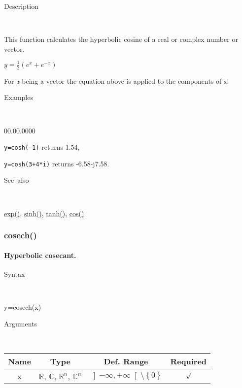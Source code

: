 \begin{description}
\item [Description]~
\end{description}
This function calculates the hyperbolic cosine of a real or complex
number or vector.

\medskip{}
$y=\frac{1}{2}\left(e^{x}+e^{-x}\right)$ 
\medskip{}

\noindent For \textit{x} being a vector the equation above is applied
to the components of \textit{x}.

\begin{description}
\item [Examples]~
\end{description}
\begin{lyxlist}{00.00.0000}
\item [\texttt{y=cosh(-1)}]returns 1.54,
\item [\texttt{y=cosh(3+4{*}i)}]returns -6.58-j7.58.
\end{lyxlist}
\begin{description}
\item [See~also]~
\end{description}
\textcolor{blue}{\hyperlink{exp}{exp()}}\textcolor{black}{,} \textcolor{blue}{\hyperlink{sinh}{sinh()}}\textcolor{black}{,}
\textcolor{blue}{\hyperlink{tanh}{tanh()}}\textcolor{black}{,} \textcolor{blue}{\hyperlink{cos}{cos()}}


\newpage
\subsubsection*{\hypertarget{cosech}{}{\Large cosech()}}


\paragraph{\label{par:Hyperbolic-cosecant}Hyperbolic cosecant.}

\begin{description}
\item [Syntax]~
\end{description}
y=cosech(x)

\begin{description}
\item [Arguments]~
\end{description}
\begin{tabular}{|c|c|c|c|}
\hline 
Name&
Type&
Def. Range&
Required\tabularnewline
\hline
\hline 
x&
$\mathbb{R}$, $\mathbb{C}$, $\mathbb{R}^{n}$, $\mathbb{C}^{n}$&
$\left]-\infty,+\infty\right[$$\setminus\left\{ 0\right\} $&
$\surd$\tabularnewline
\hline
\end{tabular}

